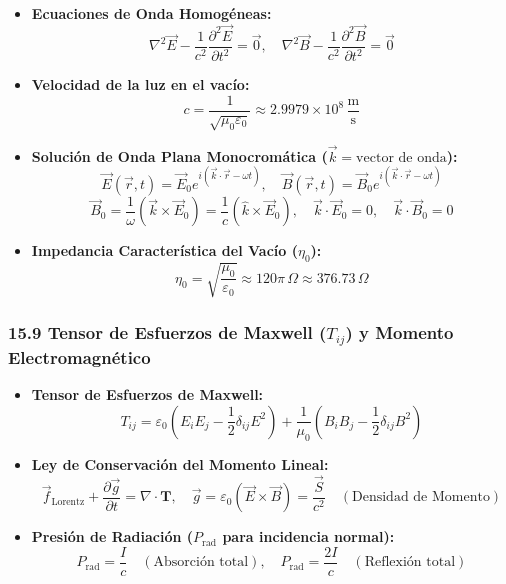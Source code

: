 \documentclass[11pt,a4paper]{article}
\begin{document}
\begin{itemize}
  \item \textbf{Ecuaciones de Onda Homogéneas:}
  \[
    \nabla^2 \vec{E} - \frac{1}{c^2} \frac{\partial^2 \vec{E}}{\partial t^2} = \vec{0}, \quad \nabla^2 \vec{B} - \frac{1}{c^2} \frac{\partial^2 \vec{B}}{\partial t^2} = \vec{0}
  \]
  \item \textbf{Velocidad de la luz en el vacío:}
  \[
    c = \frac{1}{\sqrt{\mu_0 \varepsilon_0}} \approx 2.9979 \times 10^8 \, \frac{\text{m}}{\text{s}}
  \]
  \item \textbf{Solución de Onda Plana Monocromática ($\vec{k} = \text{vector de onda}$):}
  \[
    \vec{E}(\vec{r}, t) = \vec{E}_0 e^{i(\vec{k} \cdot \vec{r} - \omega t)}, \quad \vec{B}(\vec{r}, t) = \vec{B}_0 e^{i(\vec{k} \cdot \vec{r} - \omega t)}
  \]
  \[
    \vec{B}_0 = \frac{1}{\omega} (\vec{k} \times \vec{E}_0) = \frac{1}{c} (\hat{k} \times \vec{E}_0), \quad \vec{k} \cdot \vec{E}_0 = 0, \quad \vec{k} \cdot \vec{B}_0 = 0
  \]
  \item \textbf{Impedancia Característica del Vacío ($\eta_0$):}
  \[
    \eta_0 = \sqrt{\frac{\mu_0}{\varepsilon_0}} \approx 120\pi \, \Omega \approx 376.73 \, \Omega
  \]
\end{itemize}

\subsubsection*{15.9 Tensor de Esfuerzos de Maxwell ($T_{ij}$) y Momento Electromagnético}

\begin{itemize}
  \item \textbf{Tensor de Esfuerzos de Maxwell:}
  \[
    T_{ij} = \varepsilon_0 \left( E_i E_j - \frac{1}{2} \delta_{ij} E^2 \right) + \frac{1}{\mu_0} \left( B_i B_j - \frac{1}{2} \delta_{ij} B^2 \right)
  \]
  \item \textbf{Ley de Conservación del Momento Lineal:}
  \[
    \vec{f}_{\text{Lorentz}} + \frac{\partial \vec{g}}{\partial t} = \nabla \cdot \mathbf{T}, \quad \vec{g} = \varepsilon_0 (\vec{E} \times \vec{B}) = \frac{\vec{S}}{c^2} \quad (\text{Densidad de Momento})
  \]
  \item \textbf{Presión de Radiación ($P_{\text{rad}}$ para incidencia normal):}
  \[
    P_{\text{rad}} = \frac{I}{c} \quad (\text{Absorción total}), \quad P_{\text{rad}} = \frac{2I}{c} \quad (\text{Reflexión total})
  \]
\end{itemize}
\end{document}
